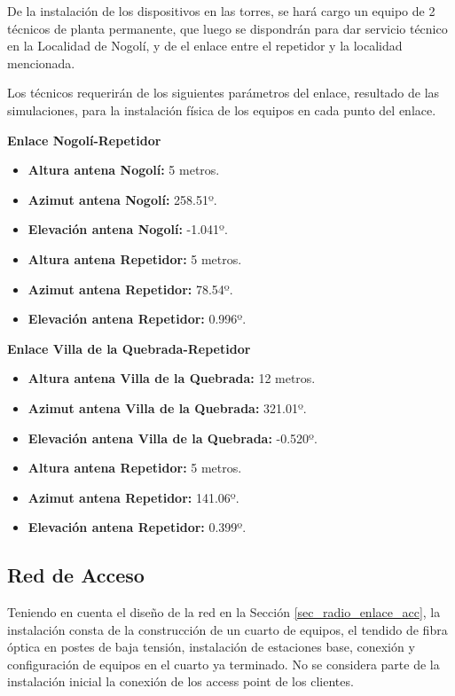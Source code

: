 \documentclass[12pt,a4paper]{book}
\begin{document}
\medskip

De la instalación de los dispositivos en las torres, se hará cargo un equipo de 2 técnicos de planta permanente, que luego se dispondrán para dar servicio técnico en la Localidad de Nogolí, y de el enlace entre el repetidor y la localidad mencionada.

\bigskip

\noindent Los técnicos requerirán de los siguientes parámetros del enlace, resultado de las simulaciones, para la instalación física de los equipos en cada punto del enlace.

\medskip

\noindent\textbf{Enlace Nogolí-Repetidor}
\begin{itemize}
\item \textbf{Altura antena Nogolí:} 5 metros.
\item \textbf{Azimut antena Nogolí:} 258.51º.
\item \textbf{Elevación antena Nogolí:} -1.041º.
\item \textbf{Altura antena Repetidor:} 5 metros.
\item \textbf{Azimut antena Repetidor:} 78.54º.
\item \textbf{Elevación antena Repetidor:} 0.996º.
\end{itemize}

\bigskip

\noindent\textbf{Enlace Villa de la Quebrada-Repetidor}
\begin{itemize}
\item \textbf{Altura antena Villa de la Quebrada:} 12 metros.
\item \textbf{Azimut antena Villa de la Quebrada:} 321.01º.
\item \textbf{Elevación antena Villa de la Quebrada:} -0.520º.
\item \textbf{Altura antena Repetidor:} 5 metros.
\item \textbf{Azimut antena Repetidor:} 141.06º.
\item \textbf{Elevación antena Repetidor:} 0.399º.
\end{itemize}

\subsection{Red de Acceso}
Teniendo en cuenta el diseño de la red en la Sección \ref{sec_radio_enlace_acc}, la instalación consta de la construcción de un cuarto de equipos, el tendido de fibra óptica en postes de baja tensión, instalación de estaciones base, conexión y configuración de equipos en el cuarto ya terminado. No se considera parte de la instalación inicial la conexión de los access point de los clientes.
\end{document}
